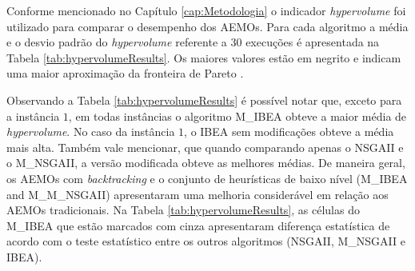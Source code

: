 Conforme mencionado no Capítulo \ref{cap:Metodologia} o indicador \textit{hypervolume} foi utilizado para comparar o desempenho dos AEMOs. Para cada algoritmo a média e o desvio padrão do \textit{hypervolume}  referente a 30 execuções é apresentada na Tabela \ref{tab:hypervolumeResults}. Os maiores valores estão em negrito e indicam uma maior aproximação da fronteira de Pareto \cite{barr1998economics}.

Observando a Tabela \ref{tab:hypervolumeResults} é possível notar que, exceto para a instância $1$, em todas instâncias o algoritmo M\_IBEA  obteve a maior média de \textit{hypervolume}. No caso da instância $1$, o IBEA sem modificações obteve a média mais alta. Também vale mencionar, que quando comparando apenas o NSGAII e o M\_NSGAII, a versão modificada obteve as melhores médias. De maneira geral, os AEMOs com \textit{backtracking} e o conjunto de heurísticas de baixo nível (M\_IBEA and M\_M_NSGAII) apresentaram uma melhoria considerável em relação aos AEMOs tradicionais. Na Tabela \ref{tab:hypervolumeResults}, as células do M\_IBEA que estão marcados com cinza apresentaram diferença estatística de acordo com o teste estatístico \cite{mckight2010kruskal} entre os outros algoritmos (NSGAII, M\_NSGAII e IBEA).






